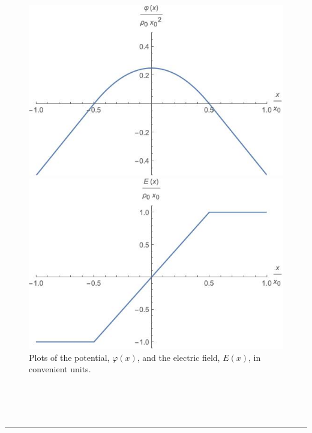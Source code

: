\documentclass[]{book}
\begin{document}
\begin{frame}{}
    \begin{figure}[h]
        \begin{minipage}[b]{0.5\linewidth}
            \centering
            \includegraphics[width=\textwidth]{1Drodpotential.jpeg}
        \end{minipage}
        \hspace{0.5cm}
        \begin{minipage}[b]{0.5\linewidth}
            \centering
            \includegraphics[width=\textwidth]{1DrodEfield.jpeg}
        \end{minipage}
        \caption{Plots of the potential, $\varphi(x)$, and the electric field, $E(x)$, in convenient units.}
    \end{figure}
\end{frame}
\\
\\
\\
\noindent\rule{15cm}{0.4pt} \\
\end{document}
